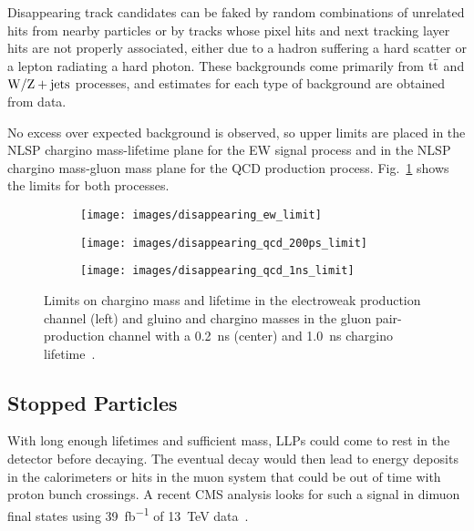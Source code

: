 \documentclass[12pt]{article}
\begin{document}
        Disappearing track candidates can be faked by random combinations of unrelated hits from nearby particles or by tracks whose pixel hits and next tracking layer hits are not properly associated, either due to a hadron suffering a hard scatter or a lepton radiating a hard photon. These backgrounds come primarily from $\mathrm{t}\bar{\mathrm{t}}$ and $\mathrm{W}/\mathrm{Z} + \mathrm{jets}$ processes, and estimates for each type of background are obtained from data.

        No excess over expected background is observed, so upper limits are placed in the NLSP chargino mass-lifetime plane for the EW signal process and in the NLSP chargino mass-gluon mass plane for the QCD production process. Fig.~\ref{disappearing_limits} shows the limits for both processes.

        \noindent \begin{figure}[htbp] \begin{center}
        \begin{subfigure}[htbp]{0.32\textwidth} \begin{center}
        \texttt{[image: images/disappearing\_ew\_limit]}
        \end{center} \end{subfigure}
        \begin{subfigure}[htbp]{0.32\textwidth} \begin{center}
        \texttt{[image: images/disappearing\_qcd\_200ps\_limit]}
        \end{center} \end{subfigure}
        \begin{subfigure}[htbp]{0.32\textwidth} \begin{center}
        \texttt{[image: images/disappearing\_qcd\_1ns\_limit]}
        \end{center} \end{subfigure}
        \caption{Limits on chargino mass and lifetime in the electroweak production channel (left) and gluino and chargino masses in the gluon pair-production channel with a \SI{0.2}{\nano\s} (center) and \SI{1.0}{\nano\s} chargino lifetime~\cite{atlas_disappearing}.}
        \label{disappearing_limits}
        \end{center} \end{figure}

    \subsection{Stopped Particles}
        With long enough lifetimes and sufficient mass, LLPs could come to rest in the detector before decaying. The eventual decay would then lead to energy deposits in the calorimeters or hits in the muon system that could be out of time with proton bunch crossings. A recent CMS analysis looks for such a signal in dimuon final states using \SI{39}{\femto\barn^{-1}} of \SI{13}{\tera\electronvolt} data~\cite{cms_stopped}. 
\end{document}
